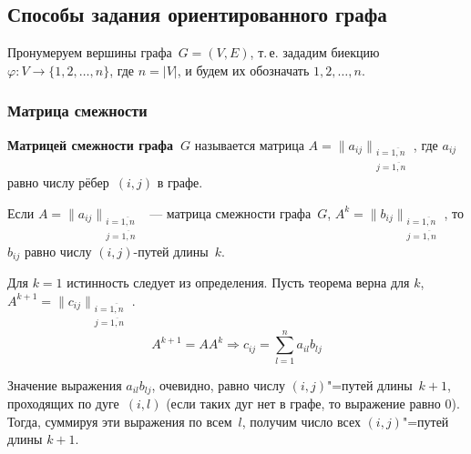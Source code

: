 \subsection{Способы задания ориентированного графа}
Пронумеруем вершины графа~$G = (V, E)$, т.\,е. зададим биекцию $\varphi \colon V \to \{ 1, 2, \ldots, n \}$, где $n = |V|$, и будем их обозначать $1, 2, \ldots, n$.

\subsubsection{Матрица смежности}
 \textbf{Матрицей смежности графа~$G$} называется матрица $A = \|a_{ij}\|_{\begin{smallmatrix}
i = \overline{1,n} \\
j = \overline{1,n}
\end{smallmatrix}}$, где $a_{ij}$ равно числу рёбер~$(i, j)$ в графе.

\begin{theorem}
Если $A = \|a_{ij}\|_{\begin{smallmatrix}
i = \overline{1,n} \\
j = \overline{1,n}
\end{smallmatrix}}$~--- матрица смежности графа~$G$,
$A^k = \|b_{ij}\|_{\begin{smallmatrix}
i = \overline{1,n} \\
j = \overline{1,n}
\end{smallmatrix}}$, то $b_{ij}$ равно числу $(i, j)$-путей длины~$k$.
\end{theorem}
\begin{proofmathind}
	\indbase Для $k = 1$ истинность следует из определения.
	\indstep Пусть теорема верна для $k$, $A^{k+1} = \|c_{ij}\|_{\begin{smallmatrix}
	i = \overline{1,n} \\
	j = \overline{1,n}
	\end{smallmatrix}}$.
	\begin{equation*}
	A^{k+1} = A A^k \Rightarrow c_{ij} = \sum_{l=1}^n a_{il} b_{lj}
	\end{equation*}
	
	Значение выражения $a_{il} b_{lj}$, очевидно, равно числу $(i, j)$"=путей длины~$k + 1$, проходящих по дуге~$(i, l)$ (если таких дуг нет в графе, то выражение равно $0$).
	Тогда, суммируя эти выражения по всем~$l$, получим число всех $(i, j)$"=путей длины $k + 1$. \indend
\end{proofmathind}

